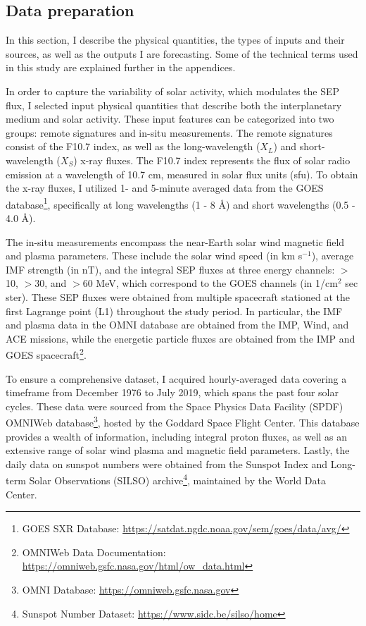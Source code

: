 \subsection{Data preparation}
In this section, I describe the physical quantities, the types of inputs and their sources, as well as the outputs I are forecasting. Some of the technical terms used in this study are explained further in the appendices.

In order to capture the variability of solar activity, which modulates the SEP flux, I selected input physical quantities that describe both the interplanetary medium and solar activity. These input features can be categorized into two groups: remote signatures and in-situ measurements.
The remote signatures consist of the F10.7 index, as well as the long-wavelength ($X_L$) and short-wavelength ($X_S$) x-ray fluxes. The F10.7 index represents the flux of solar radio emission at a wavelength of 10.7 cm, measured in solar flux units (sfu). To obtain the x-ray fluxes, I utilized 1- and 5-minute averaged data from the GOES database\footnote{GOES SXR Database: \url{https://satdat.ngdc.noaa.gov/sem/goes/data/avg/}}, specifically at long wavelengths (1 - 8 \AA) and short wavelengths (0.5 - 4.0 \AA).

The in-situ measurements encompass the near-Earth solar wind magnetic field and plasma parameters. These include the solar wind speed (in km s$^{-1}$), average IMF strength (in nT), and the integral SEP fluxes at three energy channels: $>$10, $>$30, and $>$60 MeV, which correspond to the GOES channels (in 1/cm$^2$ sec ster). These SEP fluxes were obtained from multiple spacecraft stationed at the first Lagrange point (L1) throughout the study period.
In particular, the IMF and plasma data in the OMNI database are obtained from the IMP, Wind, and ACE missions, while the energetic particle fluxes are obtained from the IMP and GOES spacecraft\footnote{OMNIWeb Data Documentation: \url{https://omniweb.gsfc.nasa.gov/html/ow_data.html}}.

To ensure a comprehensive dataset, I acquired hourly-averaged data covering a timeframe from December 1976 to July 2019, which spans the past four solar cycles. These data were sourced from the Space Physics Data Facility (SPDF) OMNIWeb database\footnote{OMNI Database: \url{https://omniweb.gsfc.nasa.gov}}, hosted by the Goddard Space Flight Center. This database provides a wealth of information, including integral proton fluxes, as well as an extensive range of solar wind plasma and magnetic field parameters.
Lastly, the daily data on sunspot numbers were obtained from the Sunspot Index and Long-term Solar Observations (SILSO) archive\footnote{Sunspot Number Dataset: \url{https://www.sidc.be/silso/home}}, maintained by the World Data Center.

